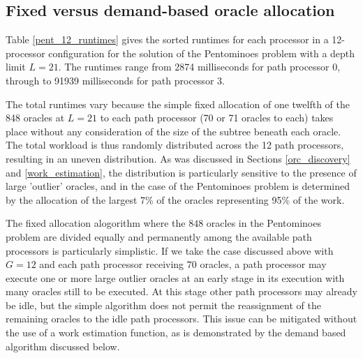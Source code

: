 \subsection{Fixed versus demand-based oracle allocation}
\label{demand_alloc}

Table \ref{pent_12_runtimes} gives the sorted runtimes for each processor in a
12-processor configuration for the solution of the Pentominoes problem with
a depth limit $L=21$.  The runtimes range from 2874 milliseconds for
path processor 0, through to 91939 milliseconds for path processor 3.

The total runtimes vary because the simple fixed allocation of one twelfth of the
848 oracles at $L=21$ to each path processor (70 or 71 oracles to each) takes place
without any consideration of the size of the subtree beneath each oracle.  The total
workload is thus randomly distributed across the 12 path processors, resulting in an
uneven distribution.  As was discussed in Sections \ref{orc_discovery} and
\ref{work_estimation}, the distribution
is particularly sensitive to the presence of large 'outlier' oracles, and in the
case of the Pentominoes problem is determined by the allocation of the largest 7\% of
the oracles representing 95\% of the work.

The fixed allocation alogorithm where the $848$ oracles in the Pentominoes problem are
divided equally and permanently among the available path processors is particularly
simplistic.  If we take the case discussed above with $G=12$ and each path processor
receiving $70$ oracles, a path processor may execute one or more large outlier oracles
at an early stage in its execution with many oracles still to be executed. At this stage
other path processors may already be idle, but the simple algorithm does not permit the
reassignment of the remaining oracles to the idle path processors.  This issue can be
mitigated without the use of a work estimation function, as is demonstrated by the
demand based algorithm discussed below.

